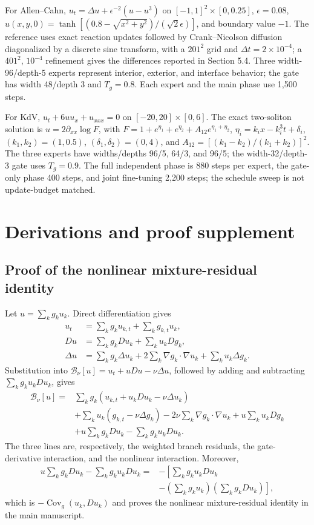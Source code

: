 \documentclass[preprint,12pt]{elsarticle}
\begin{document}
For Allen--Cahn, $u_t=\Delta u+\epsilon^{-2}(u-u^3)$ on $[-1,1]^2\times[0,0.25]$, $\epsilon=0.08$, $u(x,y,0)=\tanh[(0.8-\sqrt{x^2+y^2})/(\sqrt2\epsilon)]$, and boundary value $-1$. The reference uses exact reaction updates followed by Crank--Nicolson diffusion diagonalized by a discrete sine transform, with a $201^2$ grid and $\Delta t=2\times10^{-4}$; a $401^2$, $10^{-4}$ refinement gives the differences reported in Section 5.4. Three width-96/depth-5 experts represent interior, exterior, and interface behavior; the gate has width 48/depth 3 and $T_g=0.8$. Each expert and the main phase use 1,500 steps.

For KdV, $u_t+6uu_x+u_{xxx}=0$ on $[-20,20]\times[0,6]$. The exact two-soliton solution is $u=2\partial_{xx}\log F$, with $F=1+e^{\eta_1}+e^{\eta_2}+A_{12}e^{\eta_1+\eta_2}$, $\eta_i=k_ix-k_i^3t+\delta_i$, $(k_1,k_2)=(1,0.5)$, $(\delta_1,\delta_2)=(0,4)$, and $A_{12}=[(k_1-k_2)/(k_1+k_2)]^2$. The three experts have widths/depths 96/5, 64/3, and 96/5; the width-32/depth-3 gate uses $T_g=0.9$. The full independent phase is 880 steps per expert, the gate-only phase 400 steps, and joint fine-tuning 2,200 steps; the schedule sweep is not update-budget matched.

\section{Derivations and proof supplement}
\label{app:proofs}

\subsection{Proof of the nonlinear mixture-residual identity}
\label{app:residual_proof}

Let $u=\sum_k g_ku_k$. Direct differentiation gives
\begin{align}
u_t&=\sum_k g_ku_{k,t}+\sum_k g_{k,t}u_k,\\
Du&=\sum_k g_kDu_k+\sum_k u_kDg_k,\\
\Delta u&=\sum_k g_k\Delta u_k
+2\sum_k\nabla g_k\cdot\nabla u_k
+\sum_k u_k\Delta g_k.
\end{align}
Substitution into $\mathcal B_\nu[u]=u_t+uDu-\nu\Delta u$, followed by
adding and subtracting $\sum_k g_ku_kDu_k$, gives
\begin{align}
\mathcal B_\nu[u]
={}&\sum_k g_k(u_{k,t}+u_kDu_k-\nu\Delta u_k)\\
&+\sum_k u_k(g_{k,t}-\nu\Delta g_k)
-2\nu\sum_k\nabla g_k\cdot\nabla u_k
+u\sum_k u_kDg_k\\
&+u\sum_k g_kDu_k-\sum_k g_ku_kDu_k.
\end{align}
The three lines are, respectively, the weighted branch residuals, the
gate-derivative interaction, and the nonlinear interaction. Moreover,
\begin{align}
u\sum_k g_kDu_k-\sum_k g_ku_kDu_k
={}&-\left[\sum_k g_ku_kDu_k\right.\nonumber\\
&\left.-\left(\sum_k g_ku_k\right)
\left(\sum_k g_kDu_k\right)\right],
\end{align}
which is $-\operatorname{Cov}_g(u_k,Du_k)$ and proves
the nonlinear mixture-residual identity in the main manuscript.
\end{document}
